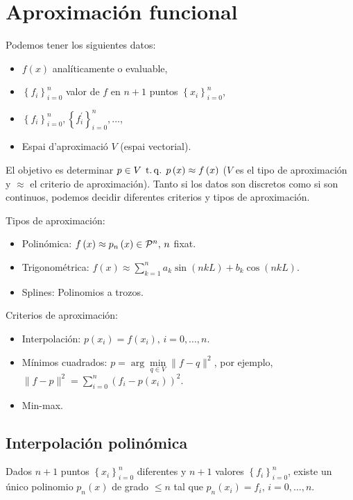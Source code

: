 \chapter{Aproximación funcional}

\noindent Podemos tener los siguientes datos:
\begin{itemize}
    \item $f\left( x \right)$ analíticamente o evaluable,
    \item $\left\{ f_i \right\}^n_{i=0}$ valor de $f$ en $n+1$ puntos $\left\{ x_i \right\}^n_{i=0}$,
    \item $\left\{ f_i \right\}^n_{i=0},\left\{ f^{\prime}_i \right\}^n_{i=0},\dots$,
    \item Espai d'aproximació $V$ (espai vectorial).
\end{itemize}

\noindent El objetivo es determinar $p\in V\operatorname{\;t.q.\;} p\left( x \right) \approx f\left( x \right)$ ($V$ es el tipo de aproximación y $\approx$ el criterio de aproximación). Tanto si los datos son discretos como si son continuos, podemos decidir diferentes criterios y tipos de aproximación. %

\quad

\noindent Tipos de aproximación:
\begin{itemize}
    \item Polinómica: $f\left( x \right)\approx p_n\left( x \right) \in \mathcal{P}^n,\, n$ fixat.
    \item Trigonométrica: $f\left( x \right)\approx \sum\limits^n_{k=1} a_k \sin\left( nkL \right) + b_k \cos\left( nkL \right)$.
    \item Splines: Polinomios a trozos.
\end{itemize}
Criterios de aproximación:
\begin{itemize}
    \item Interpolación: $p\left( x_i \right) = f\left( x_i \right), \, i=0,\dots,n$.
    \item Mínimos cuadrados: $p = \arg\min\limits_{q\in V} \|f-q\|^2$, por ejemplo, $\|f-p\|^2 = \sum\limits^n_{i=0} \left( f_i -p\left( x_i \right) \right)^2$.
    \item Min-max.
\end{itemize}

\section{Interpolación polinómica}

\begin{teo*}
    Dados $n+1$ puntos $\left\{ x_i \right\}^n_{i=0}$ diferentes y $n+1$ valores $\left\{ f_i \right\}^n_{i=0}$, existe un único polinomio $p_n\left( x \right)$ de grado $\leq n$ tal que $p_n\left( x_i \right) = f_i,\, i=0,\dots,n$.
\end{teo*}

